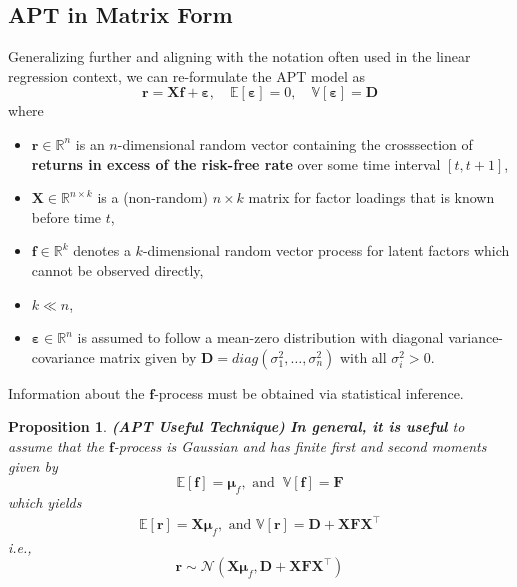 \documentclass[13pt]{article}
\newtheorem{proposition}[theorem]{Proposition}
\theoremstyle{definition}
\theoremstyle{remark}
\newenvironment{remark}
  {\pushQED{\qed}\renewcommand{\qedsymbol}{$\triangle$}\remarkx}
  {\popQED\endremarkx}
\begin{document}
\subsection{APT in Matrix Form}\label{sec:APT in Matrix Form}
Generalizing further and aligning with the notation often used in the linear regression context, we can re-formulate the APT model as 
$$
\bm{r}=\mathbf{X} \bm{f}+\bm{\varepsilon}, \quad \mathbb{E}[\bm{\varepsilon}]=0, \quad \mathbb{V}[\bm{\varepsilon}]=\mathbf{D}
$$
where 
\begin{itemize}
    \item $\bm{r} \in \mathbb{R}^{n}$ is an $n$-dimensional random vector containing the crosssection of \textbf{returns in excess of the risk-free rate} over some time interval $[t, t+1]$,
    \item $\mathbf{X} \in \mathbb{R}^{n\times k}$ is a (non-random) $n \times k$ matrix for factor loadings that is known before time $t$,
    \item $\bm{f} \in \mathbb{R}^{k}$ denotes a $k$-dimensional random vector process for latent factors which cannot be observed directly,
    \item $k \ll n$,
    \item $\bm{\varepsilon} \in \mathbb{R}^{n}$ is assumed to follow a mean-zero distribution with diagonal variance-covariance matrix given by $\mathbf{D}=diag\left(\sigma_1^2, \ldots, \sigma_n^2\right)$ with all $\sigma_i^2>0$.
\end{itemize}  
\begin{remark}
    Information about the $\bm{f}$-process must be obtained via statistical inference. 
\end{remark}

\begin{proposition}\label{prop:APT Useful Technique}\textbf{(APT Useful Technique)}
    \textbf{In general, it is useful} to assume that the $\bm{f}$-process is Gaussian and has finite first and second moments given by
$$
\mathbb{E}[\bm{f}]=\boldsymbol{\mu}_f, \text { and } ~\mathbb{V}[\bm{f}]=\mathbf{F}
$$
which yields
\begin{align}
    \mathbb{E}[\bm{r}]=\mathbf{X} \boldsymbol{\mu}_f, \text{ and } \mathbb{V}[\bm{r}]=\mathbf{D}+\mathbf{X} \mathbf{F} \mathbf{X}^{\top}
\end{align}
i.e.,
\[
\bm{r}\sim\mathcal{N}\left(\mathbf{X} \boldsymbol{\mu}_f, \mathbf{D}+\mathbf{X} \mathbf{F} \mathbf{X}^{\top}\right)
\]

\end{proposition}
\end{document}

